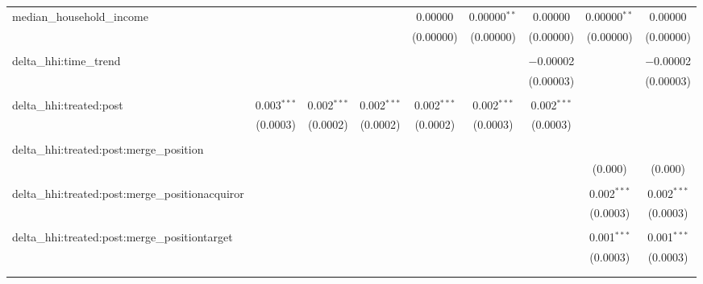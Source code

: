 \begin{table}[H]
{\begin{tabular}{@{\extracolsep{5pt}}lcccccccc}
  median\_household\_income &  &  &  & 0.00000 & 0.00000$^{**}$ & 0.00000 & 0.00000$^{**}$ & 0.00000 \\  

   &  &  &  & (0.00000) & (0.00000) & (0.00000) & (0.00000) & (0.00000) \\  

   & & & & & & & & \\  

  delta\_hhi:time\_trend &  &  &  &  &  & $-$0.00002 &  & $-$0.00002 \\  

   &  &  &  &  &  & (0.00003) &  & (0.00003) \\  

   & & & & & & & & \\  

  delta\_hhi:treated:post & 0.003$^{***}$ & 0.002$^{***}$ & 0.002$^{***}$ & 0.002$^{***}$ & 0.002$^{***}$ & 0.002$^{***}$ &  &  \\  

   & (0.0003) & (0.0002) & (0.0002) & (0.0002) & (0.0003) & (0.0003) &  &  \\  

   & & & & & & & & \\  

  delta\_hhi:treated:post:merge\_position &  &  &  &  &  &  &  &  \\  

   &  &  &  &  &  &  & (0.000) & (0.000) \\  

   & & & & & & & & \\  

  delta\_hhi:treated:post:merge\_positionacquiror &  &  &  &  &  &  & 0.002$^{***}$ & 0.002$^{***}$ \\  

   &  &  &  &  &  &  & (0.0003) & (0.0003) \\  

   & & & & & & & & \\  

  delta\_hhi:treated:post:merge\_positiontarget &  &  &  &  &  &  & 0.001$^{***}$ & 0.001$^{***}$ \\  

   &  &  &  &  &  &  & (0.0003) & (0.0003) \\  

   & & & & & & & & \\  

 \hline \\[-1.8ex]  


\end{tabular}}
\end{table}
